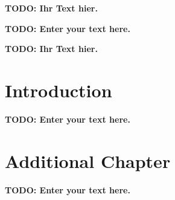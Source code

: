 \documentclass[draft,final]{vutinfth} %
\newcommand{\todo}[1]{{\color{red}\textbf{TODO: {#1}}}} %
\begin{document}
\frontmatter %

\addstatementpage

\begin{danksagung*}
\todo{Ihr Text hier.}
\end{danksagung*}

\begin{acknowledgements*}
\todo{Enter your text here.}
\end{acknowledgements*}

\begin{kurzfassung}
\todo{Ihr Text hier.}
\end{kurzfassung}

\begin{abstract}
\todo{Enter your text here.}
\end{abstract}


\tableofcontents %

\mainmatter

\chapter{Introduction}
\todo{Enter your text here.}

\chapter{Additional Chapter}
\todo{Enter your text here.}


\backmatter

\listoffigures %

\listoftables %

\listofalgorithms
{}

\printindex

\printglossaries



\end{document}
